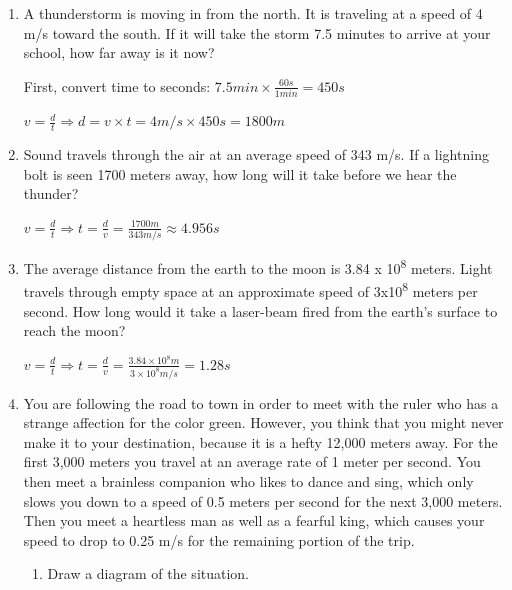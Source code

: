 \documentclass[letterpaper, 12pt]{article}
\begin{document}
\begin{enumerate}
\item A thunderstorm is moving in from the north.  It is traveling at a speed of 4 m/s toward the south.  If it will take the storm 7.5 minutes to arrive at your school, how far away is it now?

\color{red}

\begin{center} First, convert time to seconds: $ 7.5 min \times \frac{60s}{1min} = 450 s$
	
	\vspace{0.1in}
	
$	v = \frac{d}{t} \Longrightarrow d = v \times t = 4 m/s \times 450 s = 1800 m $
	
\end{center}


\vspace{0.05in}
\color{black}



\item Sound travels through the air at an average speed of 343 m/s. If a lightning bolt is seen 1700 meters away, how long will it take before we hear the thunder?
\color{red}

\begin{center} $ v = \frac{d}{t} \Longrightarrow t = \frac{d}{v} = \frac{1700m}{343m/s} \approx 4.956 s $
	
\end{center}


\vspace{0.15in}
\color{black}




\item The average distance from the earth to the moon is 3.84 x 10\textsuperscript{8} meters.  Light travels through empty space at an approximate speed of 3x10\textsuperscript{8} meters per second.  How long would it take a laser-beam fired from the earth's surface to reach the moon?

\color{red}

\begin{center} $ v = \frac{d}{t} \Longrightarrow t = \frac{d}{v} = \frac{3.84 \times 10^8 m}{3 \times 10^8 m/s} = 1.28 s $
	
\end{center}


\vspace{0.15in}
\color{black}


\item You are following the road to town in order to meet with the ruler who has a strange affection for the color green.  However, you think that you might never make it to your destination, because it is a hefty 12,000 meters away.  For the first 3,000 meters you travel at an average rate of 1 meter per second.  You then meet a brainless companion who likes to dance and sing, which only  slows you down to a speed of 0.5 meters per second for the next 3,000 meters.  Then you meet a heartless man as well as a fearful king, which causes your speed to drop to 0.25 m/s for the remaining portion of the trip.  
\begin{enumerate} \item Draw a diagram of the situation.
\color{red}


\end{enumerate}
\end{enumerate}
\end{document}
